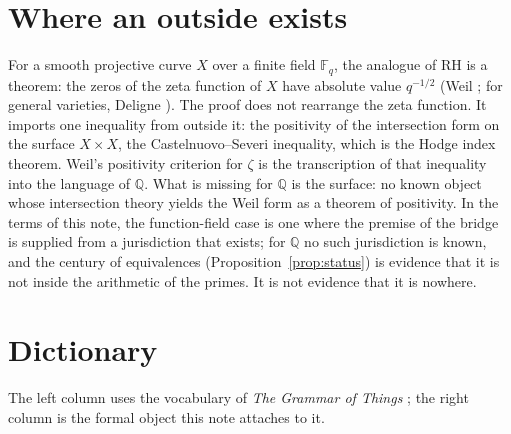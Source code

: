\documentclass[11pt]{article}
\theoremstyle{definition}
\theoremstyle{remark}
\newcommand{\Q}{\mathbb Q}
\newcommand{\RH}{\mathrm{RH}}
\begin{document}
\section{Where an outside exists}\label{sec:outside}

For a smooth projective curve $X$ over a finite field $\mathbb F_q$, the analogue of $\RH$ is a theorem: the zeros of the zeta function of $X$ have absolute value $q^{-1/2}$ (Weil \cite{WeilCurves}; for general varieties, Deligne \cite{Deligne}). The proof does not rearrange the zeta function. It imports one inequality from outside it: the positivity of the intersection form on the surface $X\times X$, the Castelnuovo--Severi inequality, which is the Hodge index theorem. Weil's positivity criterion for $\zeta$ \cite{Weil} is the transcription of that inequality into the language of $\Q$. What is missing for $\Q$ is the surface: no known object whose intersection theory yields the Weil form as a theorem of positivity. In the terms of this note, the function-field case is one where the premise of the bridge is supplied from a jurisdiction that exists; for $\Q$ no such jurisdiction is known, and the century of equivalences (Proposition~\ref{prop:status}) is evidence that it is not inside the arithmetic of the primes. It is not evidence that it is nowhere.

\section{Dictionary}\label{sec:dictionary}

The left column uses the vocabulary of \emph{The Grammar of Things} \cite{Grammar}; the right column is the formal object this note attaches to it.
\end{document}

